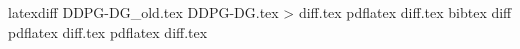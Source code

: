 latexdiff DDPG-DG_old.tex DDPG-DG.tex > diff.tex
pdflatex diff.tex
bibtex diff
pdflatex diff.tex
pdflatex diff.tex
